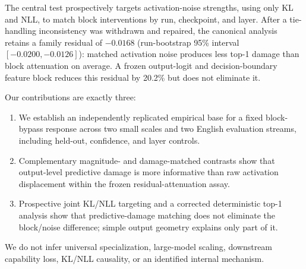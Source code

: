 The central test prospectively targets activation-noise strengths, using only
KL and NLL, to match block interventions by run, checkpoint, and layer. After a
tie-handling inconsistency was withdrawn and repaired, the canonical analysis
retains a family residual of $-0.0168$ (run-bootstrap 95\% interval
$[-0.0200,-0.0126]$): matched activation noise produces less top-1 damage than
block attenuation on average. A frozen output-logit and decision-boundary
feature block reduces this residual by 20.2\% but does not eliminate it.

Our contributions are exactly three:
\begin{enumerate}
    \item We establish an independently replicated empirical base for a fixed
    block-bypass response across two small \model{} scales and two English
    evaluation streams, including held-out, confidence, and layer controls.
    \item Complementary magnitude- and damage-matched contrasts show that
    output-level predictive damage is more informative than raw activation
    displacement within the frozen residual-attenuation assay.
    \item Prospective joint KL/NLL targeting and a corrected deterministic
    top-1 analysis show that predictive-damage matching does not eliminate the
    block/noise difference; simple output geometry explains only part of it.
\end{enumerate}

We do not infer universal specialization, large-model scaling, downstream
capability loss, KL/NLL causality, or an identified internal mechanism.
